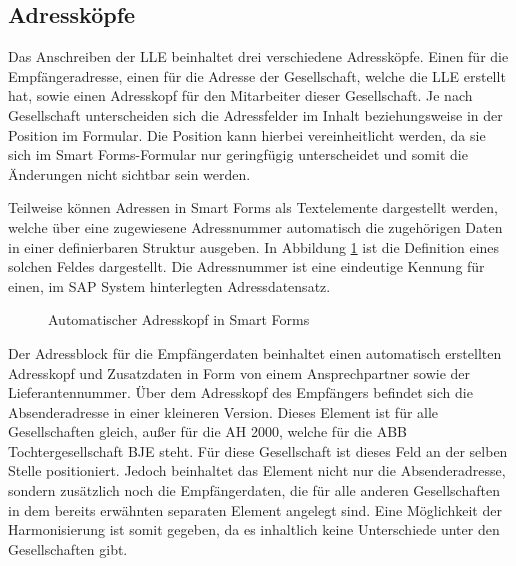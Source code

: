 	\subsection{Adressköpfe}
	\label{ist:adr}
	
	Das Anschreiben der \ac{LLE} beinhaltet drei verschiedene Adressköpfe. Einen für die Empfängeradresse, einen für die Adresse der Gesellschaft, welche die \ac{LLE} erstellt hat, sowie einen Adresskopf für den Mitarbeiter dieser Gesellschaft. Je nach Gesellschaft unterscheiden sich die Adressfelder im Inhalt beziehungsweise in der Position im Formular. Die Position kann hierbei vereinheitlicht werden, da sie sich im Smart Forms-Formular nur geringfügig unterscheidet und somit die Änderungen nicht sichtbar sein werden. 
	
	Teilweise können Adressen in Smart Forms als Textelemente dargestellt werden, welche über eine zugewiesene Adressnummer automatisch die zugehörigen Daten in einer definierbaren Struktur ausgeben. In Abbildung \ref{auto} ist die Definition eines solchen Feldes dargestellt. Die Adressnummer ist eine eindeutige Kennung für einen, im SAP System hinterlegten Adressdatensatz.
			\begin{figure}[ht]
			\centering
			\caption{Automatischer Adresskopf in Smart Forms}
			\label{auto}
		\end{figure} 
	\FloatBarrier
	
	 Der Adressblock für die Empfängerdaten beinhaltet einen automatisch erstellten Adresskopf und Zusatzdaten in Form von einem Ansprechpartner sowie der Lieferantennummer. Über dem Adresskopf des Empfängers befindet sich die Absenderadresse in einer kleineren Version. Dieses Element ist für alle Gesellschaften gleich, außer für die \ac{AH} 2000, welche für die \ac{ABB} Tochtergesellschaft \ac{BJE} steht. Für diese Gesellschaft ist dieses Feld an der selben Stelle positioniert. Jedoch beinhaltet das Element nicht nur die Absenderadresse, sondern zusätzlich noch die Empfängerdaten, die für alle anderen Gesellschaften in dem bereits erwähnten separaten Element angelegt sind. Eine Möglichkeit der Harmonisierung ist somit gegeben, da es inhaltlich keine Unterschiede unter den Gesellschaften gibt.
	
